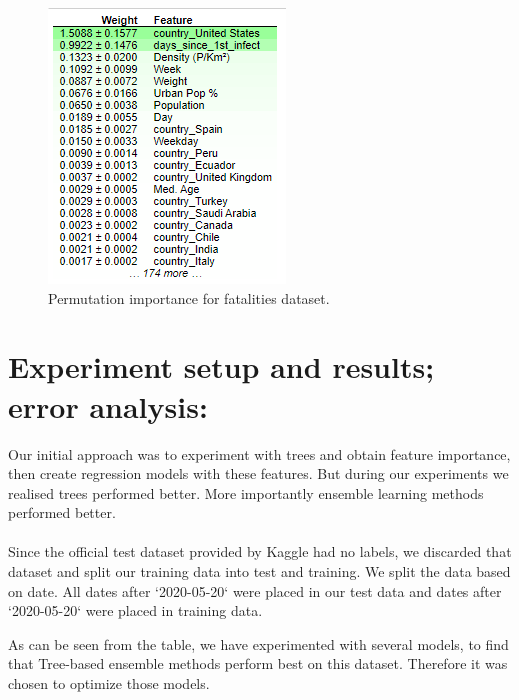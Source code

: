 \documentclass{article}
\begin{document}
\begin{figure}
    \centering
    \includegraphics{feature-permutation-importance-f-data.png}
    \caption{Permutation importance for fatalities dataset.}
\end{figure}

\section{Experiment setup and results; error analysis:}
Our initial approach was to experiment with trees and obtain feature importance, then create regression models with these features. But during our experiments we realised trees performed better. More importantly ensemble learning methods performed better.
\\
\\
Since the official test dataset provided by Kaggle had no labels, we discarded that dataset and split our training data into test and training. We split the data based on date. All dates after `2020-05-20` were placed in our test data and dates after  `2020-05-20` were placed in training data.

As can be seen from the table, we have experimented with several models, to find that Tree-based ensemble methods perform best on this dataset. Therefore it was chosen to optimize those models. 
\end{document}
